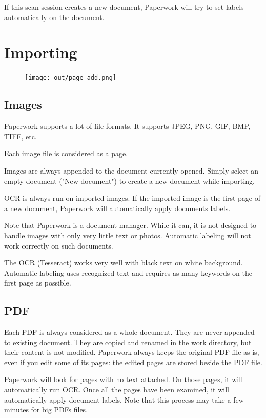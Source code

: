\documentclass[10pt,a4paper]{article}
\begin{document}
If this scan session creates a new document, Paperwork will try to set labels
automatically on the document.


\section{Importing}

\begin{figure}[H]
	\texttt{[image: out/page\_add.png]}
\end{figure}


\subsection{Images}

Paperwork supports a lot of file formats. It supports JPEG, PNG, GIF,
BMP, TIFF, etc.

Each image file is considered as a page.

Images are always appended to the document currently opened. Simply
select an empty document ("New document") to create a new document while
importing.

OCR is always run on imported images. If the imported image is the
first page of a new document, Paperwork will automatically apply documents
labels.

Note that Paperwork is a document manager. While it can, it is not
designed to handle images with only very little text or photos. Automatic
labeling will not work correctly on such documents.

The OCR (Tesseract) works very well with black text on white background.
Automatic labeling uses recognized text and requires as many keywords
on the first page as possible.


\subsection{PDF}

Each PDF is always considered as a whole document. They are never
appended to existing document. They are copied and renamed in the work
directory, but their content is not modified.
Paperwork always keeps the original PDF file as is, even if you edit some
of its pages: the edited pages are stored beside the PDF file.

Paperwork will look for pages with no text attached. On those pages,
it will automatically run OCR. Once all the pages have been examined,
it will automatically apply document labels. Note that this process
may take a few minutes for big PDFs files.
\end{document}
